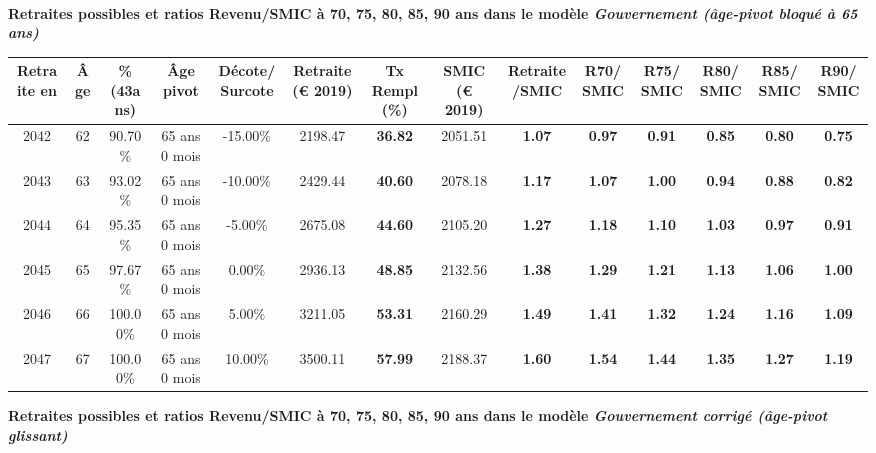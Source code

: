  ~\\{\bf \noindent Retraites possibles et ratios Revenu/SMIC à 70, 75, 80, 85, 90 ans dans le modèle \emph{Gouvernement (âge-pivot bloqué à 65 ans)}}  
 
\begin{adjustbox}{max width=\textwidth} 
\begin{tabular}[htb]{|c|c||c|c|c||c|c||c|c||c|c|c|c|c|} 
\hline 
 Retraite en &  Âge &  \%(43ans) &  Âge pivot &  Décote/Surcote &  Retraite (\euro{} 2019) &  Tx Rempl(\%) &  SMIC (\euro{} 2019) &  Retraite/SMIC &  R70/SMIC &  R75/SMIC &  R80/SMIC &  R85/SMIC &  R90/SMIC \\ 
\hline \hline 
 2042 &  62 &  90.70\% &  65 ans 0 mois &  -15.00\% &  2198.47 &  {\bf 36.82} &  2051.51 &  {\bf 1.07} &  {\bf {\color{red} 0.97}} &  {\bf {\color{red} 0.91}} &  {\bf {\color{red} 0.85}} &  {\bf {\color{red} 0.80}} &  {\bf {\color{red} 0.75}} \\ 
\hline 
 2043 &  63 &  93.02\% &  65 ans 0 mois &  -10.00\% &  2429.44 &  {\bf 40.60} &  2078.18 &  {\bf 1.17} &  {\bf 1.07} &  {\bf 1.00} &  {\bf {\color{red} 0.94}} &  {\bf {\color{red} 0.88}} &  {\bf {\color{red} 0.82}} \\ 
\hline 
 2044 &  64 &  95.35\% &  65 ans 0 mois &  -5.00\% &  2675.08 &  {\bf 44.60} &  2105.20 &  {\bf 1.27} &  {\bf 1.18} &  {\bf 1.10} &  {\bf 1.03} &  {\bf {\color{red} 0.97}} &  {\bf {\color{red} 0.91}} \\ 
\hline 
 2045 &  65 &  97.67\% &  65 ans 0 mois &  0.00\% &  2936.13 &  {\bf 48.85} &  2132.56 &  {\bf 1.38} &  {\bf 1.29} &  {\bf 1.21} &  {\bf 1.13} &  {\bf 1.06} &  {\bf {\color{red} 1.00}} \\ 
\hline 
 2046 &  66 &  100.00\% &  65 ans 0 mois &  5.00\% &  3211.05 &  {\bf 53.31} &  2160.29 &  {\bf 1.49} &  {\bf 1.41} &  {\bf 1.32} &  {\bf 1.24} &  {\bf 1.16} &  {\bf 1.09} \\ 
\hline 
 2047 &  67 &  100.00\% &  65 ans 0 mois &  10.00\% &  3500.11 &  {\bf 57.99} &  2188.37 &  {\bf 1.60} &  {\bf 1.54} &  {\bf 1.44} &  {\bf 1.35} &  {\bf 1.27} &  {\bf 1.19} \\ 
\hline 
\hline 
\end{tabular} 
\end{adjustbox} 
 
 \vspace{0.1cm} 
{\bf \noindent Retraites possibles et ratios Revenu/SMIC à 70, 75, 80, 85, 90 ans dans le modèle \emph{Gouvernement corrigé (âge-pivot glissant)}}  
 
